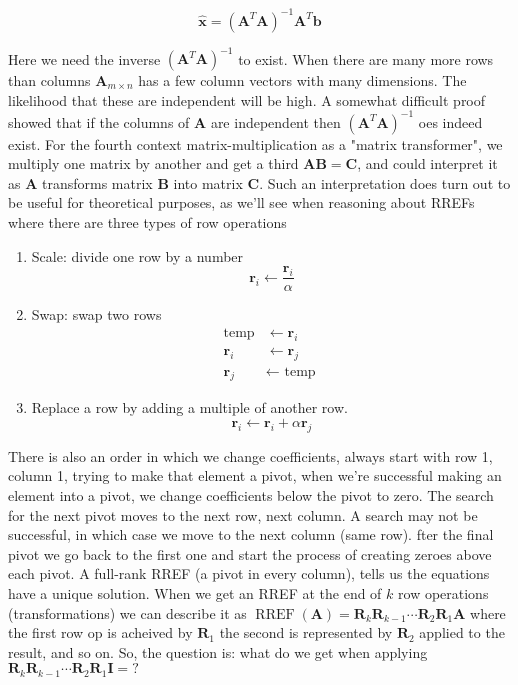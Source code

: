 \documentclass[main.tex]{subfiles}
\begin{document}
    $$\hat{\mathbf{x}}=\left(\mathbf{A}^{T} \mathbf{A}\right)^{-1} \mathbf{A}^{T} \mathbf{b}$$
    
    Here we need the inverse $\left(\mathbf{A}^{T} \mathbf{A}\right)^{-1}$ to exist. When there are many more rows than columns $\mathbf{A}_{m \times n}$ has a few column vectors with many dimensions. The likelihood that these are independent will be high. A somewhat difficult proof showed that if the columns of $\mathbf{A}$ are independent then $\left(\mathbf{A}^{T} \mathbf{A}\right)^{-1}$ oes indeed exist. For the fourth context matrix-multiplication as a "matrix transformer", we multiply one matrix by another and get a third $\mathbf{A B}=\mathbf{C}$, and could interpret it as $\mathbf{A}$ transforms matrix $\mathbf{B}$ into matrix $\mathbf{C}$. Such an interpretation does turn out to be useful for theoretical purposes, as we'll see when reasoning about RREFs where there are three types of row operations
    
    \begin{enumerate}
        \item Scale: divide one row by a number
        $$
        \mathbf{r}_{i} \leftarrow \frac{\mathbf{r}_{i}}{\alpha}
        $$
        \item Swap: swap two rows
        $$
        \begin{aligned}
        \operatorname{temp} & \leftarrow \mathbf{r}_{i} \\
        \mathbf{r}_{i} & \leftarrow \mathbf{r}_{j} \\
        \mathbf{r}_{j} & \leftarrow \text { temp }
        \end{aligned}
        $$    
        \item Replace a row by adding a multiple of another row.
        $$
        \mathbf{r}_{i} \leftarrow \mathbf{r}_{i}+\alpha \mathbf{r}_{j}
        $$
    \end{enumerate}
    
    There is also an order in which we change coefficients, always start with row 1, column 1, trying to make that element a pivot, when we're successful making an element into a pivot, we change coefficients below the pivot to zero. The search for the next pivot moves to the next row, next column. A search may not be successful, in which case we move to the next column (same row). fter the final pivot we go back to the first one and start the process of creating zeroes above each pivot. A full-rank RREF (a pivot in every column), tells us the equations have a unique solution. When we get an RREF at the end of $k$ row operations (transformations) we can describe it as $\operatorname{RREF}(\mathbf{A})=\mathbf{R}_{k} \mathbf{R}_{k-1} \cdots \mathbf{R}_{2} \mathbf{R}_{1} \mathbf{A}$ where the first row op is acheived by $\mathbf{R}_{1}$ the second is represented by $\mathbf{R}_{2}$ applied to the result, and so on. So, the question is: what do we get when applying $\mathbf{R}_{k} \mathbf{R}_{k-1} \cdots \mathbf{R}_{2} \mathbf{R}_{1} \mathbf{I}=?$ \\
    
\end{document}
